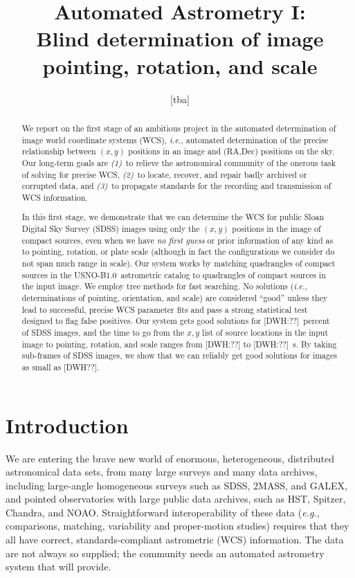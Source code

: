 \documentclass[12pt,preprint]{aastex}
\newcommand{\latin}[1]{\textit{#1}}
\newcommand{\ie}{\latin{i.e.}}
\newcommand{\eg}{\latin{e.g.}}
\newcommand{\usnob}{USNO-B1.0}
\begin{document}
\title{
  Automated Astrometry I:\\
  Blind determination of image pointing, rotation, and scale
}
\author{
  [tba]
}

\begin{abstract}
We report on the first stage of an ambitious project in the automated
determination of image world coordinate systems (WCS), \ie, automated
determination of the precise relationship between $(x,y)$ positions in
an image and (RA,Dec) positions on the sky.  Our long-term goals are
\textsl{(1)}~to relieve the astronomical community of the onerous task
of solving for precise WCS, \textsl{(2)}~to locate, recover, and
repair badly archived or corrupted data, and \textsl{(3)}~to propagate
standards for the recording and transmission of WCS information.

In this first stage, we demonstrate that we can determine the WCS for
public Sloan Digital Sky Survey (SDSS) images using only the $(x,y)$
positions in the image of compact sources, even when we have \emph{no
first guess} or prior information of any kind as to pointing,
rotation, or plate scale (although in fact the configurations we
consider do not span much range in scale).  Our system works by
matching quadrangles of compact sources in the \usnob\ astrometric
catalog to quadrangles of compact sources in the input image.  We
employ tree methods for fast searching.  No solutions (\ie,
determinations of pointing, orientation, and scale) are considered
``good'' unless they lead to successful, precise WCS parameter fits
and pass a strong statistical test designed to flag false positives.
Our system gets good solutions for [DWH:??]~percent of SDSS images,
and the time to go from the $x,y$ list of source locations in the
input image to pointing, rotation, and scale ranges from [DWH:??]  to
[DWH:??]~s.  By taking sub-frames of SDSS images, we show that we can
reliably get good solutions for images as small as [DWH??].

\end{abstract}


\section{Introduction}

We are entering the brave new world of enormous, heterogeneous,
distributed astronomical data sets, from many large surveys and many
data archives, including large-angle homogeneous surveys such as SDSS,
2MASS, and GALEX, and pointed observatories with large public data
archives, such as HST, Spitzer, Chandra, and NOAO.  Straightforward
interoperability of these data (\eg, comparisons, matching,
variability and proper-motion studies) requires that they all have
correct, standards-compliant astrometric (WCS) information.  The data
are not always so supplied; the community needs an automated
astrometry system that will provide.
\end{document}
